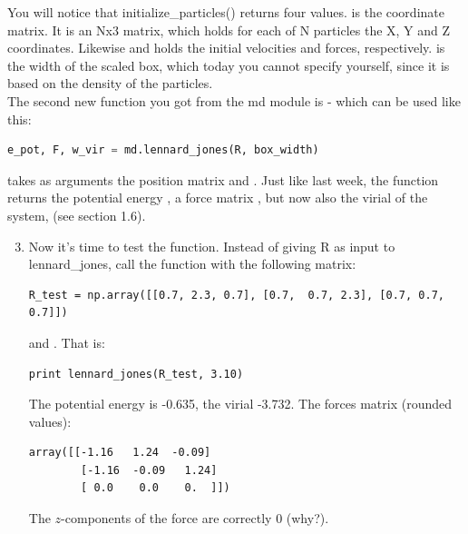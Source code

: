 \documentclass{article}
\begin{document}
You will notice that initialize\_particles() returns four values.
 is the coordinate matrix. It is an Nx3 matrix, which holds for each of N particles
the X, Y and Z coordinates.
Likewise  and  holds the initial velocities and forces, respectively.
 is the width of the scaled box, which today you cannot specify yourself,
since it is based on the density of the particles.\\


%
%
%
%

The second new function you got from the md module is  - which
can be used like this:

\begin{lstlisting}[language=python]
e_pot, F, w_vir = md.lennard_jones(R, box_width)
\end{lstlisting}

 takes as arguments the position matrix  and .
Just like last week, the  function returns the potential energy
, a force matrix , but now also the virial of the system,
 (see section 1.6).\\


\begin{enumerate}
    \setcounter{enumi}{2}

    \item
    Now it's time to test the  function. Instead of giving R as input
    to lennard\_jones, call the function with the following  matrix:

\begin{lstlisting}
R_test = np.array([[0.7, 2.3, 0.7], [0.7,  0.7, 2.3], [0.7, 0.7, 0.7]])
\end{lstlisting}

    and . That is:

\begin{lstlisting}
print lennard_jones(R_test, 3.10)
\end{lstlisting}

    The potential energy is -0.635, the virial -3.732. The forces matrix (rounded
    values):

\begin{lstlisting}
array([[-1.16   1.24  -0.09]
        [-1.16  -0.09   1.24]
        [ 0.0    0.0    0.  ]])
\end{lstlisting}

    The $z$-components of the force are correctly 0 (why?).

\end{enumerate}
\end{document}
